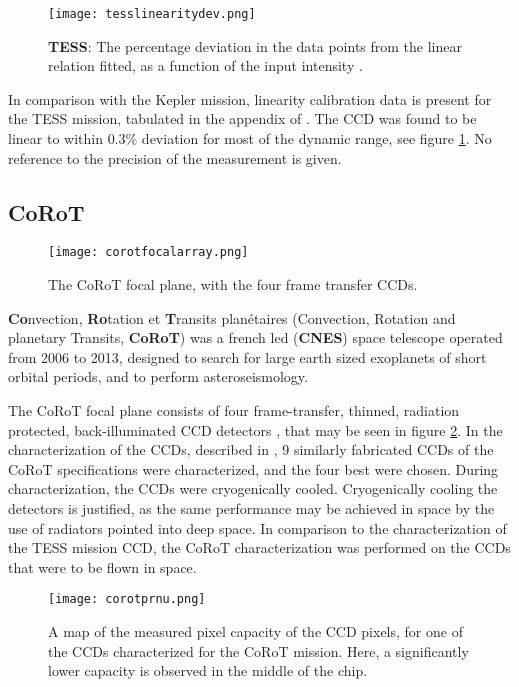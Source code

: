 \documentclass[../main.tex]{subfiles}
\begin{document}
\begin{figure}
	\centering
	\texttt{[image: tesslinearitydev.png]}
	\caption{\textbf{TESS}: The percentage deviation in the data points from the linear relation fitted, as a function of the input intensity \cite{tesscharacterization}.}
	\label{fig:tesslinearitydev}
\end{figure}

In comparison with the Kepler mission, linearity calibration data is present for the TESS mission, tabulated in the appendix of \cite{tessinstrumenthandbook}. The CCD was found to be linear to within $0.3\%$ deviation for most of the dynamic range\cite{tesscharacterization}, see figure \ref{fig:tesslinearitydev}. No reference to the precision of the measurement is given.

\subsection{CoRoT}
\begin{figure}
	\centering
	\texttt{[image: corotfocalarray.png]}
	\caption{The CoRoT focal plane, with the four frame transfer CCDs.}
	\label{fig:corotfocalplane}
\end{figure}
\textbf{Co}nvection, \textbf{Ro}tation et \textbf{T}ransits planétaires (Convection, Rotation and planetary Transits, \textbf{CoRoT}) was a french led (\textbf{CNES}) space telescope operated from 2006 to 2013, designed to search for large earth sized exoplanets of short orbital periods, and to perform asteroseismology.

The CoRoT focal plane consists of four frame-transfer, thinned, radiation protected, back-illuminated CCD detectors \cite{refId0}, that may be seen in figure \ref{fig:corotfocalplane}. In the characterization of the CCDs, described in \cite{corotCharCCD}, 9 similarly fabricated CCDs of the CoRoT specifications were characterized, and the four best were chosen. During characterization, the CCDs were cryogenically cooled. Cryogenically cooling the detectors is justified, as the same performance may be achieved in space by the use of radiators pointed into deep space. In comparison to the characterization of the TESS mission CCD, the CoRoT characterization was performed on the CCDs that were to be flown in space.

\begin{figure}
	\centering
	\texttt{[image: corotprnu.png]}
	\caption{A map of the measured pixel capacity of the CCD pixels, for one of the CCDs characterized for the CoRoT mission. Here, a significantly lower capacity is observed in the middle of the chip.}
	\label{fig:corotccdprnu}
\end{figure}
\end{document}
